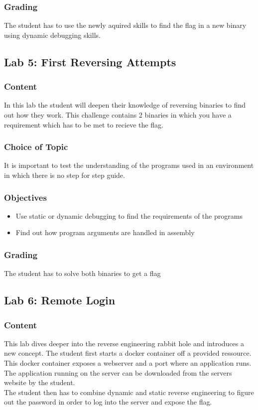 \subsubsection*{Grading}
The student has to use the newly aquired skills to find the flag in a new binary using dynamic debugging skills.

\subsection{Lab 5: First Reversing Attempts}
\subsubsection*{Content}
In this lab the student will deepen their knowledge of reversing binaries to find out how they work. This challenge contains 2 binaries in which you have a requirement which has to be met to recieve the flag.
\subsubsection*{Choice of Topic}
It is important to test the understanding of the programs used in an environment in which there is no step for step guide.
\subsubsection*{Objectives}
\begin{itemize}
    \item Use static or dynamic debugging to find the requirements of the programs
    \item Find out how program arguments are handled in assembly
\end{itemize}
\subsubsection*{Grading}
The student has to solve both binaries to get a flag

\subsection{Lab 6: Remote Login}
\subsubsection*{Content}
This lab dives deeper into the reverse engineering rabbit hole and introduces a new concept. The student first starts a docker container off a provided ressource.
This docker container exposes a webserver and a port where an application runs. The application running on the server can be downloaded from the servers website by the student. \\
The student then has to combine dynamic and static reverse engineering to figure out the password in order to log into the server and expose the flag.
